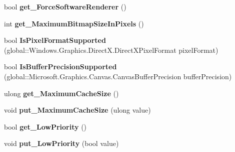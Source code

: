 \begin{DoxyCompactItemize}
bool {\bfseries get\+\_\+\+Force\+Software\+Renderer} ()
\item 
\mbox{\label{class_microsoft_1_1_graphics_1_1_canvas_1_1_canvas_device_af71c8661ed6a571c7678dfcd97de7bc8}} 
int {\bfseries get\+\_\+\+Maximum\+Bitmap\+Size\+In\+Pixels} ()
\item 
\mbox{\label{class_microsoft_1_1_graphics_1_1_canvas_1_1_canvas_device_a01381b0e199054ee3d65ce1d6916972f}} 
bool {\bfseries Is\+Pixel\+Format\+Supported} (global\+::\+Windows.\+Graphics.\+Direct\+X.\+Direct\+X\+Pixel\+Format pixel\+Format)
\item 
\mbox{\label{class_microsoft_1_1_graphics_1_1_canvas_1_1_canvas_device_a05ed962d04bfea58842bb028fe6b8c4e}} 
bool {\bfseries Is\+Buffer\+Precision\+Supported} (global\+::\+Microsoft.\+Graphics.\+Canvas.\+Canvas\+Buffer\+Precision buffer\+Precision)
\item 
\mbox{\label{class_microsoft_1_1_graphics_1_1_canvas_1_1_canvas_device_a5f095678b43b4ace5f118aa2556deffe}} 
ulong {\bfseries get\+\_\+\+Maximum\+Cache\+Size} ()
\item 
\mbox{\label{class_microsoft_1_1_graphics_1_1_canvas_1_1_canvas_device_a87716d3ac1ed253fcee0a5e307d24b50}} 
void {\bfseries put\+\_\+\+Maximum\+Cache\+Size} (ulong value)
\item 
\mbox{\label{class_microsoft_1_1_graphics_1_1_canvas_1_1_canvas_device_a95f4876747bf8ac6c5fd2b67a83fed4f}} 
bool {\bfseries get\+\_\+\+Low\+Priority} ()
\item 
\mbox{\label{class_microsoft_1_1_graphics_1_1_canvas_1_1_canvas_device_ad1a2be7ca3c55a404a27d0e562278094}} 
void {\bfseries put\+\_\+\+Low\+Priority} (bool value)
\item 
\mbox{\label{class_microsoft_1_1_graphics_1_1_canvas_1_1_canvas_device_a631e1f27d9faf64d8b1ee234ffde2ed8}} 

\end{DoxyCompactItemize}

